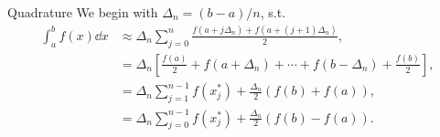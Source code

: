 \begin{frame}{Quadrature}
We begin with $\Delta_n  = (b - a)/n$, s.t.
\begin{align*}
	\int_{a}^{b} f(x) \dd x & \approx \Delta_n \sum_{j = 0}^{n} \frac{f(a + j \Delta_n) + f(a + (j+1) \Delta_n)}{2}, \\
	& = \Delta_n \left[ \frac{f(a)}{2} + f(a+\Delta_n) + \cdots + f(b-\Delta_n) + \frac{f(b)}{2} \right], \\
	& = \Delta_n \sum_{j = 1}^{n-1} f(x_j^*) + \frac{\Delta_n}{2} \left( f(b) + f(a) \right), \\
	& = \Delta_n \sum_{j = 0}^{n-1} f(x_j^*) + \frac{\Delta_n}{2} \left( f(b) - f(a) \right).
\end{align*}
\end{frame}

